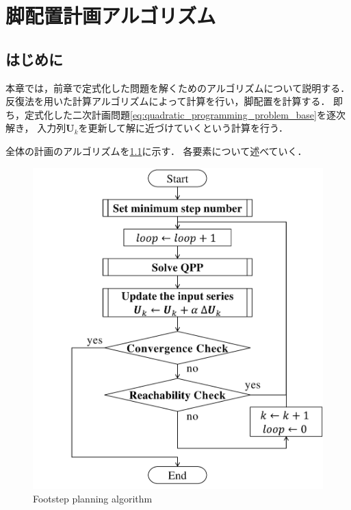 \documentclass[autodetect-engine,dvipdfmx-if-dvi,ja=standard,a4j,jbase=11pt,magstyle=nomag*]{bxjsreport}
\begin{document}
\chapter{脚配置計画アルゴリズム}

\section{はじめに}
本章では，前章で定式化した問題を解くためのアルゴリズムについて説明する．
反復法を用いた計算アルゴリズムによって計算を行い，脚配置を計算する．
即ち，定式化した二次計画問題\cref{eq:quadratic_programming_problem_base}を逐次解き，
入力列$\bm{U}_k$を更新して解に近づけていくという計算を行う．

全体の計画のアルゴリズムを\cref{fig:algorithm_planning}に示す．
各要素について述べていく．

\begin{figure}[t]
    \centering
    \includegraphics[width=\linewidth, clip]{./figure/algorithm_planning.pdf}
    \caption{Footstep planning algorithm}
    \label{fig:algorithm_planning}
\end{figure}
\end{document}
